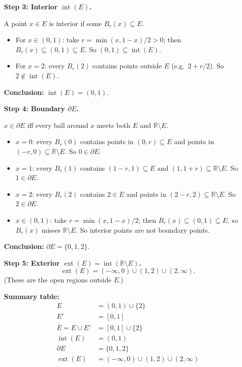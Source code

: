 \begin{example}[Computing $E'$, $\overline{E}$, $\partial E$, $\operatorname{int}(E)$,
$\operatorname{ext}(E)$ for $E = (0,1) \cup \{2\}$ in $\mathbb{R}$]
\medskip
\noindent\textbf{Step 3: Interior $\operatorname{int}(E)$.}

A point $x \in E$ is interior if some $B_r(x) \subseteq E$.

\begin{itemize}
  \item For $x \in (0,1)$: take $r = \min(x, 1-x)/2 > 0$; then $B_r(x) \subseteq (0,1) \subseteq E$.
        So $(0,1) \subseteq \operatorname{int}(E)$.
  \item For $x = 2$: every $B_r(2)$ contains points outside $E$ (e.g.\ $2 + r/2$).
        So $2 \notin \operatorname{int}(E)$.
\end{itemize}

\noindent\textbf{Conclusion:} $\operatorname{int}(E) = (0,1)$.

\medskip
\noindent\textbf{Step 4: Boundary $\partial E$.}

$x \in \partial E$ iff every ball around $x$ meets both $E$ and $\mathbb{R} \setminus E$.

\begin{itemize}
  \item $x = 0$: every $B_r(0)$ contains points in $(0, r) \subseteq E$ and
        points in $(-r, 0) \subseteq \mathbb{R} \setminus E$. So $0 \in \partial E$.
  \item $x = 1$: every $B_r(1)$ contains $(1-r, 1) \subseteq E$ and $(1, 1+r) \subseteq \mathbb{R}\setminus E$.
        So $1 \in \partial E$.
  \item $x = 2$: every $B_r(2)$ contains $2 \in E$ and points in $(2-r, 2) \subseteq \mathbb{R} \setminus E$.
        So $2 \in \partial E$.
  \item $x \in (0,1)$: take $r = \min(x,1-x)/2$; then $B_r(x) \subseteq (0,1) \subseteq E$,
        so $B_r(x)$ misses $\mathbb{R} \setminus E$. So interior points are not boundary points.
\end{itemize}

\noindent\textbf{Conclusion:} $\partial E = \{0, 1, 2\}$.

\medskip
\noindent\textbf{Step 5: Exterior $\operatorname{ext}(E) = \operatorname{int}(\mathbb{R} \setminus E)$.}
\[
\operatorname{ext}(E) = (-\infty, 0) \cup (1, 2) \cup (2, \infty).
\]
(These are the open regions outside $E$.)

\medskip
\noindent\textbf{Summary table:}
\[
\begin{array}{ll}
E & = (0,1) \cup \{2\} \\
E' & = [0,1] \\
\overline{E} = E \cup E' & = [0,1] \cup \{2\} \\
\operatorname{int}(E) & = (0,1) \\
\partial E & = \{0, 1, 2\} \\
\operatorname{ext}(E) & = (-\infty,0) \cup (1,2) \cup (2,\infty)
\end{array}
\]


\end{example}
